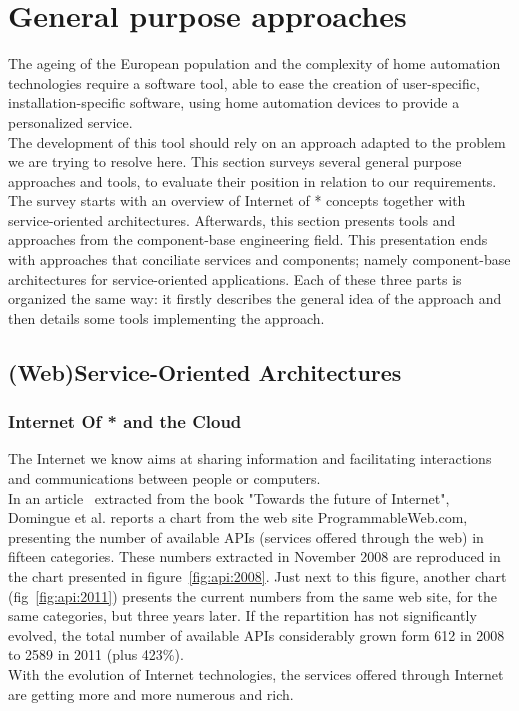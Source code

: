 \newpage
\section{General purpose approaches}
\label{sec:generalPurposeApproaches}

The ageing of the European population and the complexity of home automation technologies require a software tool, able to ease the creation of user-specific, installation-specific software, using home automation devices to provide a personalized service.\\
The development of this tool should rely on an approach adapted to the problem we are trying to resolve here. This section surveys several general purpose approaches and tools, to evaluate their position in relation to our requirements.\\

The survey starts with an overview of Internet of * concepts together with service-oriented architectures. Afterwards, this section presents tools and approaches from the component-base engineering field. This presentation ends with approaches that conciliate services and components; namely component-base architectures for service-oriented applications. Each of these three parts is organized the same way: it firstly describes the general idea of the approach and then details some tools implementing the approach.


\subsection{(Web)Service-Oriented Architectures}
\label{sec:web-services}


\subsubsection{Internet Of * and the Cloud}
\label{subsec:internet_of_stars}

The Internet we know aims at sharing information and facilitating interactions and communications between people or computers.\\

In an article~\cite{Domingue:2009} extracted from the book "Towards the future of Internet", Domingue et al. reports a chart from the web site ProgrammableWeb.com, presenting the number of available APIs (services offered through the web) in fifteen categories. These numbers extracted in November 2008 are reproduced in the chart presented in figure~\ref{fig:api:2008}. Just next to this figure, another chart (fig~\ref{fig:api:2011}) presents the current numbers from the same web site, for the same categories, but three years later. If the repartition has not significantly evolved, the total number of available APIs considerably grown form 612 in 2008 to 2589 in 2011 (plus 423\%).\\
With the evolution of Internet technologies, the services offered through Internet are getting more and more numerous and rich.\\

